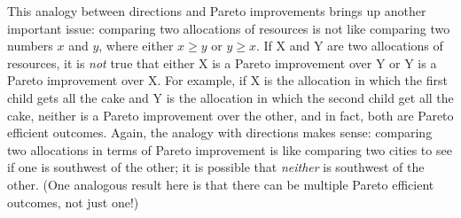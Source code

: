 This analogy between directions and Pareto improvements brings up another important issue: comparing two allocations of resources is not like comparing two numbers $x$ and $y$, where either $x\geq y$ or $y\geq x$. If X and Y are two allocations of resources, it is \emph{not} true that either X is a Pareto improvement over Y or Y is a Pareto improvement over X. For example, if X is the allocation in which the first child gets all the cake and Y is the allocation in which the second child get all the cake, neither is a Pareto improvement over the other, and in fact, both are Pareto efficient outcomes. Again, the analogy with directions makes sense: comparing two allocations in terms of Pareto improvement is like comparing two cities to see if one is southwest of the other; it is possible that \emph{neither} is southwest of the other. (One analogous result here is that there can be multiple Pareto efficient outcomes, not just one!)




